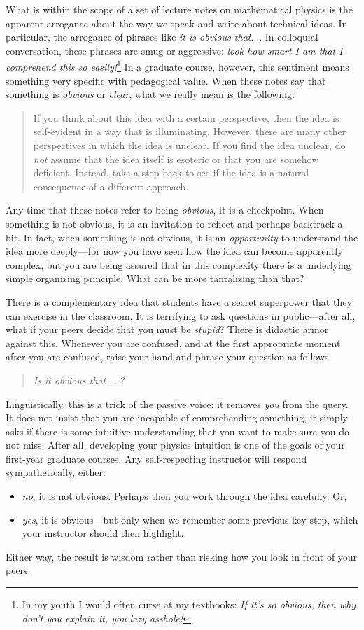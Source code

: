 \documentclass[
  11pt,
	colorful,
	raggedright,
]{tufte-style-thesis-flip}
\begin{document}
What is within the scope of a set of lecture notes on mathematical physics is the apparent arrogance about the way we speak and write about technical ideas. In particular, the arrogance of phrases like \emph{it is obvious that$\ldots$}. In colloquial conversation, these phrases are smug or aggressive: \emph{look how smart I am that I comprehend this so easily!}\footnote{In my youth I would often curse at my textbooks: \emph{If it's so obvious, then why don't you explain it, you lazy asshole!}} In a graduate course, however, this sentiment means something very specific with pedagogical value. When these notes say that something is \emph{obvious} or \emph{clear}, what we really mean is the following:
\begin{quote}
If you think about this idea with a certain perspective, then the idea is self-evident in a way that is illuminating. However, there are many other perspectives in which the idea is unclear. If you find the idea unclear, do \emph{not} assume that the idea itself is esoteric or that you are somehow deficient. Instead, take a step back to see if the idea is a natural consequence of a different approach. 
\end{quote}
Any time that these notes refer to being \emph{obvious}, it is a checkpoint. When something is not obvious, it is an invitation to reflect and perhaps backtrack a bit. In fact, when something is not obvious, it is an \emph{opportunity} to understand the idea more deeply---for now you have seen how the idea can become apparently complex, but you are being assured that in this complexity there is a underlying simple organizing principle. What can be more tantalizing than that?

There is a complementary idea that students have a secret superpower that they can exercise in the classroom. It is terrifying to ask questions in public---after all, what if your peers decide that you must be \emph{stupid}? There is didactic armor against this. Whenever you are confused, and at the first appropriate moment after you are confused, raise your hand and phrase your question as follows:
\begin{quote}
\emph{Is it obvious that} $\ldots$ ?
\end{quote}
Linguistically, this is a trick of the passive voice: it removes \emph{you} from the query. It does not insist that you are incapable of comprehending something, it simply asks if there is some intuitive understanding that you want to make sure you do not miss. After all, developing your physics intuition is one of the goals of your first-year graduate courses. Any self-respecting instructor will respond sympathetically, either:
\begin{itemize}
  \item \emph{no}, it is not obvious. Perhaps then you work through the idea carefully. Or,
  \item \emph{yes}, it is obvious---but only when we remember some previous key step, which your instructor should then highlight.
\end{itemize}
Either way, the result is wisdom rather than risking how you look in front of your peers. 
\end{document}
